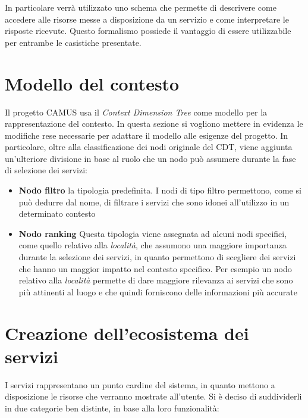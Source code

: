 In particolare verrà utilizzato uno schema che permette di descrivere come accedere alle risorse messe a disposizione da un servizio e come interpretare le risposte ricevute. Questo formalismo possiede il vantaggio di essere utilizzabile per entrambe le casistiche presentate.

\section{Modello del contesto\label{sec:modello-contesto}}

Il progetto CAMUS usa il \emph{Context Dimension Tree} come modello per la rappresentazione del contesto. In questa sezione si vogliono mettere in evidenza le modifiche rese necessarie per adattare il modello alle esigenze del progetto. In particolare, oltre alla classificazione dei nodi originale del CDT, viene aggiunta un'ulteriore divisione in base al ruolo che un nodo può assumere durante la fase di selezione dei servizi:

\begin{itemize}
	\item \textbf{Nodo filtro}
	\upe la tipologia predefinita. I nodi di tipo filtro permettono, come si può dedurre dal nome, di filtrare i servizi che sono idonei all'utilizzo in un determinato contesto
	\item \textbf{Nodo ranking}
	Questa tipologia viene assegnata ad alcuni nodi specifici, come quello relativo alla \emph{località}, che assumono una maggiore importanza durante la selezione dei servizi, in quanto permettono di scegliere dei servizi che hanno un maggior impatto nel contesto specifico. Per esempio un nodo relativo alla \emph{località} permette di dare maggiore rilevanza ai servizi che sono più attinenti al luogo e che quindi forniscono delle informazioni più accurate
\end{itemize}

\section{Creazione dell'ecosistema dei servizi\label{sec:ecosistema-servizi}}

I servizi rappresentano un punto cardine del sistema, in quanto mettono a disposizione le risorse che verranno mostrate all'utente. Si è deciso di suddividerli in due categorie ben distinte, in base alla loro funzionalità:

